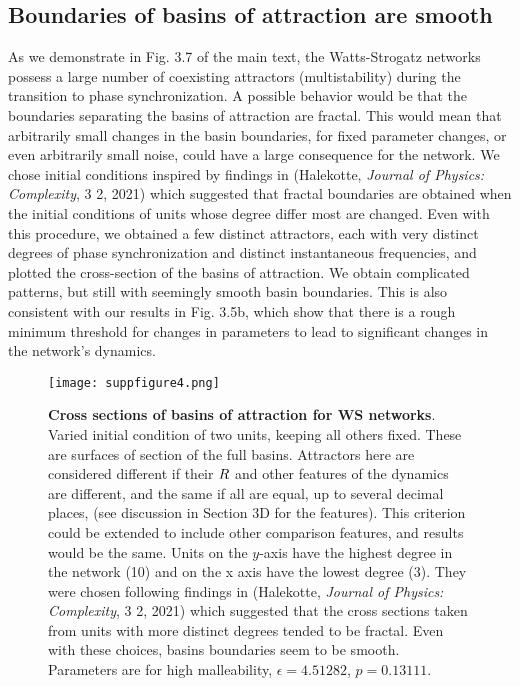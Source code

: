 \subsection*{Boundaries of basins of attraction are smooth}

As we demonstrate in Fig. 3.7 of the main text, the Watts-Strogatz networks possess a large number of coexisting attractors (multistability) during the transition to phase synchronization. A possible behavior would be that the boundaries separating the basins of attraction are fractal. This would mean that arbitrarily small changes in the basin boundaries, for fixed parameter changes, or even arbitrarily small noise, could have a large consequence for the network. We chose initial conditions inspired by findings in (Halekotte, \textit{Journal of Physics: Complexity}, 3 2, 2021) which suggested that fractal boundaries are obtained when the initial conditions of units whose degree differ most are changed. Even with this procedure, we obtained a few distinct attractors, each with very distinct degrees of phase synchronization and distinct instantaneous frequencies, and plotted the cross-section of the basins of attraction. We obtain complicated patterns, but still with seemingly smooth basin boundaries. This is also consistent with our results in Fig. 3.5b, which show that there is a rough minimum threshold for changes in parameters to lead to significant changes in the network's dynamics.
%
\begin{figure*}[htb]
    \centering
    \texttt{[image: suppfigure4.png]}
    \caption{\textbf{Cross sections of basins of attraction  for WS networks}. Varied initial condition of two units, keeping all others fixed. These are surfaces of section of the full basins. Attractors here are considered different if their $R$ and other features of the dynamics are different, and the same if all are equal, up to several decimal places, (see discussion in Section 3D for the features). This criterion could be extended to include other comparison features, and results would be the same. Units on the $y$-axis have the highest degree in the network (10) and on the x axis have the lowest degree (3). They were chosen following findings in (Halekotte, \textit{Journal of Physics: Complexity}, 3 2, 2021) which suggested that the cross sections taken from units with more distinct degrees tended to be fractal. Even with these choices, basins boundaries seem to be smooth. Parameters are for high malleability, $\epsilon = 4.51282$, $p = 0.13111$. }
    \label{sup:fig:basins}
\end{figure*}

